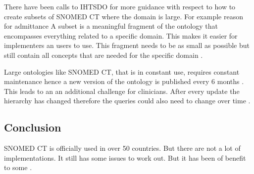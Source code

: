 \documentclass[12pt,a4paper]{article}
\begin{document}
There have been calls to IHTSDO for more guidance with respect to how to create subsets of SNOMED CT where the domain is large. For example reason for admittance \cite[p92]{Lee2013} A subset is a meaningful fragment of the ontology that encompasses everything related to a specific domain. This makes it easier for implementers an users to use. This fragment needs to be as small as possible but still contain all concepts that are needed for the specific domain \citep[p25]{subset}.

Large ontologies like SNOMED CT, that is in constant use, requires constant maintenance hence a new version of the ontology is published every 6 months \citep{snocr}. This leads to an an additional challenge for clinicians. After every update the hierarchy has changed therefore the queries could also need to change over time \cite[p92]{Lee2013}.

\subsection{Conclusion}
SNOMED CT is officially used in over 50 countries. But there are not a lot of implementations. It still has some issues to work out. But it has been of benefit to some \cite[p93]{Lee2013}. 


\end{document}
